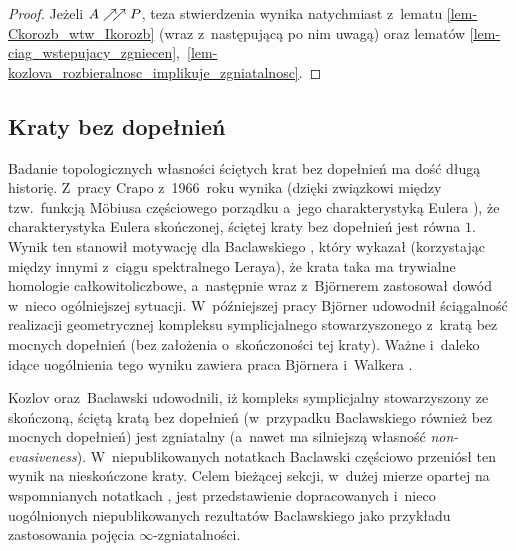 \begin{proof}
Jeżeli $A\nearrow\!\!\nearrow P$, teza stwierdzenia wynika natychmiast z~lematu \ref{lem-Ckorozb_wtw_Ikorozb} (wraz z~następującą po nim uwagą) oraz lematów \ref{lem-ciag_wstepujacy_zgniecen},~\ref{lem-kozlova_rozbieralnosc_implikuje_zgniatalnosc}.
\end{proof}


\subsection{Kraty bez dopełnień}
Badanie topologicznych własności ściętych krat bez dopełnień ma dość długą historię. Z~pracy Crapo \cite{Crapo66} z~1966~roku wynika (dzięki związkowi między tzw.~funkcją M{\"o}biusa częściowego porządku a~jego charakterystyką Eulera \cite[(9.14)]{Bjorner95}), że charakterystyka Eulera skończonej, ściętej kraty bez dopełnień jest równa $1$. Wynik ten stanowił motywację dla Baclawskiego \cite[Corollary 6.3]{Baclawski77}, który wykazał (korzystając między innymi z~ciągu spektralnego Leraya), że krata taka ma trywialne homologie całkowitoliczbowe, a~następnie wraz z~Bj{\"o}rnerem \cite[Theorem 3]{Baclawski81} zastosował dowód w~nieco ogólniejszej sytuacji. W~późniejszej pracy Bj{\"o}rner \cite[Theorem 3.3]{Bjorner81} udowodnił ściągalność realizacji geometrycznej kompleksu symplicjalnego stowarzyszonego z~kratą bez mocnych dopełnień (bez założenia o~skończoności tej kraty). Ważne i~daleko idące uogólnienia tego wyniku zawiera praca Bj{\"o}rnera i~Walkera \cite{Bjorner83}. 

Kozlov \cite[Theorem 2.4]{Kozlov98} oraz~Baclawski \cite[Theorem 27]{Baclawski12} udowodnili, iż kompleks symplicjalny stowarzyszony ze skończoną, ściętą kratą bez dopełnień (w~przypadku Baclawskiego również bez mocnych dopełnień) jest zgniatalny (a~nawet ma silniejszą własność \mbox{\textit{non-evasiveness}}). W~niepublikowanych notatkach Baclawski \cite{Baclawski} częściowo przeniósł ten wynik na nieskończone kraty. Celem bieżącej sekcji, w~dużej mierze opartej na wspomnianych notatkach \cite{Baclawski},  jest przedstawienie dopracowanych i~nieco uogólnionych niepublikowanych rezultatów Baclawskiego jako przykładu zastosowania pojęcia $\infty$-zgniatalności.

